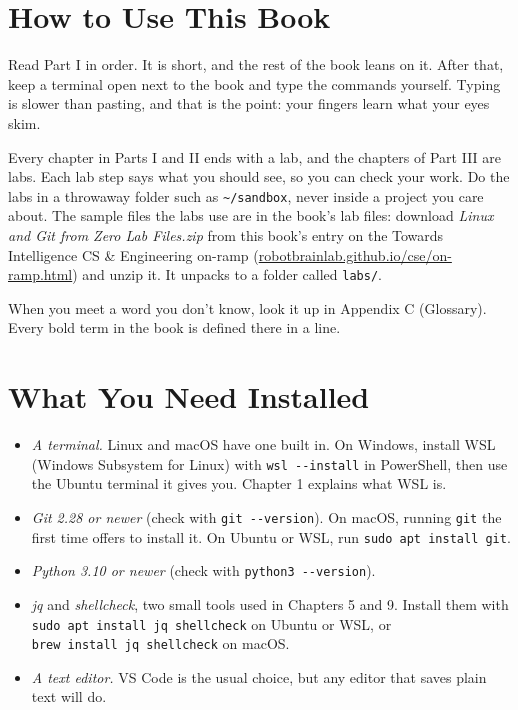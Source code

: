 \section{How to Use This Book}\label{00-preface:how-to-use-this-book}

Read Part I in order. It is short, and the rest of the book leans on it. After that, keep a terminal open next to the book and type the commands yourself. Typing is slower than pasting, and that is the point: your fingers learn what your eyes skim.

Every chapter in Parts I and II ends with a lab, and the chapters of Part III are labs. Each lab step says what you should see, so you can check your work. Do the labs in a throwaway folder such as \texttt{\textasciitilde{}/sandbox}, never inside a project you care about. The sample files the labs use are in the book's lab files: download \emph{Linux and Git from Zero Lab Files.zip} from this book's entry on the Towards Intelligence CS \& Engineering on-ramp (\href{https://robotbrainlab.github.io/cse/on-ramp.html}{robotbrainlab.github.io/cse/on-ramp.html}) and unzip it. It unpacks to a folder called \texttt{labs/}.

When you meet a word you don't know, look it up in Appendix C (Glossary). Every bold term in the book is defined there in a line.

\section{What You Need Installed}\label{00-preface:what-you-need-installed}

\begin{itemize}
\tightlist
\item
  \emph{A terminal.} Linux and macOS have one built in. On Windows, install WSL (Windows Subsystem for Linux) with \texttt{wsl\ -\/-install} in PowerShell, then use the Ubuntu terminal it gives you. Chapter 1 explains what WSL is.
\item
  \emph{Git 2.28 or newer} (check with \texttt{git\ -\/-version}). On macOS, running \texttt{git} the first time offers to install it. On Ubuntu or WSL, run \texttt{sudo\ apt\ install\ git}.
\item
  \emph{Python 3.10 or newer} (check with \texttt{python3\ -\/-version}).
\item
  \emph{jq} and \emph{shellcheck}, two small tools used in Chapters 5 and 9. Install them with \texttt{sudo\ apt\ install\ jq\ shellcheck} on Ubuntu or WSL, or \texttt{brew\ install\ jq\ shellcheck} on macOS.
\item
  \emph{A text editor.} VS Code is the usual choice, but any editor that saves plain text will do.
\end{itemize}


